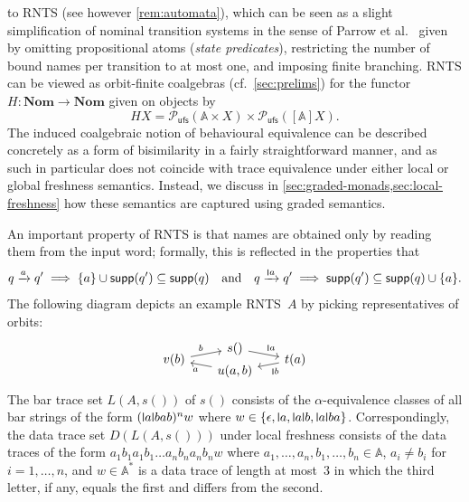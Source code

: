\documentclass[a4paper,UKenglish,cleveref,thm-restate,numberwithinsect,final]{lipics-v2021}
\newcommand{\Names}{\mathbb{A}}
\newcommand{\powufs}{\pow_{\mathsf{ufs}}}
\newcommand{\pow}{\mathcal{P}}
\newcommand{\supp}{\mathsf{supp}}
\theoremstyle{plain}
\newcommand{\midmid}{\hspace{0.2ex}{\rule[-0.1ex]{0.6pt}{1.65ex}}\hspace{0.2ex}}
\newcommand{\scriptmidmid}{\hspace{0.2ex}{\rule[-0.1ex]{0.6pt}{1.1ex}}\hspace{0.2ex}}
\newcommand{\newletter}[1]{{\midmid}#1}
\newcommand{\scriptnew}[1]{{\scriptmidmid}#1}
\numberwithin{equation}{section}
\newcommand{\+}[1]{\mathcal{#1}\xspace}
\newcommand{\Nom}{\mathbf{Nom}}
\theoremstyle{definition}
\begin{document}
to RNTS (see however \cref{rem:automata}), which can be seen as a
slight simplification of nominal transition systems in the sense of
Parrow et al.~\cite{ParrowEA21} given by omitting propositional atoms
(\emph{state predicates}), restricting the number of bound names per
transition to at most one, and imposing finite
branching. %
RNTS can be viewed as orbit-finite coalgebras (cf.~\cref{sec:prelims})
for the functor \(H\colon \Nom \to \Nom\) given on objects by
\begin{equation}\label{eq:rnna-functor}
  HX = \powufs(\Names \times X) \times \powufs([\Names]X).
\end{equation}
The induced coalgebraic notion of behavioural equivalence can be
described concretely as a form of bisimilarity in a fairly
straightforward manner, and as such in particular does not coincide
with trace equivalence under either local or global freshness
semantics. Instead, we discuss in
\cref{sec:graded-monads,sec:local-freshness} how these semantics are
captured using graded semantics.

An important property of RNTS is that names are
obtained only by reading them from the input word; formally, this is
reflected in the properties that
\begin{equation*}
  q\xrightarrow{a}q' \implies \{a\} \cup\supp(q')\subseteq\supp(q)
  \quad\text{and}\quad
  q\xrightarrow{\scriptnew a}q' \implies \supp(q')\subseteq\supp(q)\cup\{a\}.
\end{equation*}
The following diagram depicts an example RNTS~$A$ by picking
representatives of orbits:
\begin{equation*}
  \begin{tikzcd}[row sep=-3.0mm, column sep=6mm,baseline=-1mm]
    & s()\arrow[dr,"\scriptnew a"]\\
    v(b) \arrow[ur,"b"]& & t(a)\arrow[dl,"\scriptnew b"]\\
    & u(a,b)\arrow[ul,"a"]
  \end{tikzcd}
\end{equation*}
The bar trace set $L(A,s())$ of $s()$ consists of the
$\alpha$-equivalence classes of all bar strings of the form
$(\newletter a\newletter bab)^nw$ where
$w\in\{\epsilon,\newletter a,\newletter a \newletter b,\newletter a
\newletter ba\}$. Correspondingly, the data trace set $D(L(A,s()))$
under local freshness consists of the data traces of the form
$a_1b_1a_1b_1\dots a_nb_na_nb_nw$ where
$a_1,\dots,a_n,b_1,\dots,b_n\in\Names$, $a_i\neq b_i$ for
$i=1,\dots,n$, and $w\in\Names^*$ is a data trace of length at
most~$3$ in which the third letter, if any, equals the first and
differs from the second.
\end{document}
